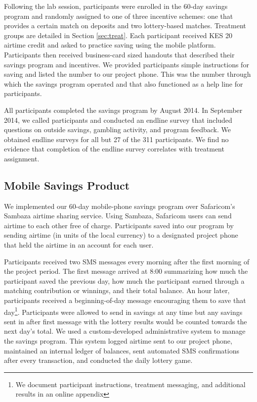 \documentclass[12pt]{article}
\begin{document}
		Following the lab session, participants were enrolled in the 60-day savings program and randomly assigned to one of three incentive schemes: one that provides a certain match on deposits and two lottery-based matches. Treatment groups are detailed in Section \ref{sec:treat}. Each participant received KES 20 airtime credit and asked to practice saving using the mobile platform. Participants then received business-card sized handouts that described their savings program and incentives. We provided participants simple instructions for saving and listed the number to our project phone. This was the number through which the savings program operated and that also functioned as a help line for participants.

		All participants completed the savings program by August 2014. In September 2014, we called participants and conducted an endline survey that included questions on outside savings, gambling activity, and program feedback. We obtained endline surveys for all but 27 of the 311 participants. We find no evidence that completion of the endline survey correlates with treatment assignment.

		\clearpage

	\subsection{Mobile Savings Product}

		We implemented our 60-day mobile-phone savings program over Safaricom's Sambaza airtime sharing service. Using Sambaza, Safaricom users can send airtime to each other free of charge. Participants saved into our program by sending airtime (in units of the local currency) to a designated project phone that held the airtime in an account for each user.

		Participants received two SMS messages every morning after the first morning of the project period. The first message arrived at 8:00 summarizing how much the participant saved the previous day, how much the participant earned through a matching contribution or winnings, and their total balance. An hour later, participants received a beginning-of-day message encouraging them to save that day\footnote{We document participant instructions, treatment messaging, and additional results in an online appendix}. Participants were allowed to send in savings at any time but any savings sent in after first message with the lottery results would be counted towards the next day's total. We used a custom-developed administrative system to manage the savings program. This system logged airtime sent to our project phone, maintained an internal ledger of balances, sent automated SMS confirmations after every transaction, and conducted the daily lottery game.
\end{document}
